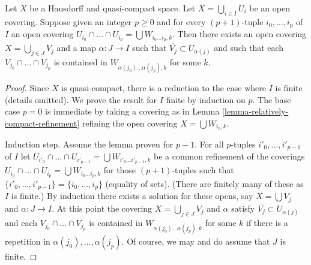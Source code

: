 \begin{lemma}
\label{lemma-refine-covering}
Let $X$ be a Hausdorff and quasi-compact space.
Let $X = \bigcup_{i \in I} U_i$ be an open covering.
Suppose given an integer $p \geq 0$ and for every $(p + 1)$-tuple
$i_0, \ldots, i_p$ of $I$ an open covering
$U_{i_0} \cap \ldots \cap U_{i_p} = \bigcup W_{i_0 \ldots i_p, k}$.
Then there exists an open covering $X = \bigcup_{j \in J} V_j$
and a map $\alpha : J \to I$ such that $\overline{V_j} \subset U_{\alpha(j)}$
and such that each $V_{j_0} \cap \ldots \cap V_{j_p}$
is contained in $W_{\alpha(j_0) \ldots \alpha(j_p), k}$
for some $k$.
\end{lemma}

\begin{proof}
Since $X$ is quasi-compact, there is a reduction to the
case where $I$ is finite (details omitted).
We prove the result for $I$ finite by induction on $p$.
The base case $p = 0$ is immediate by taking a covering as in
Lemma \ref{lemma-relatively-compact-refinement}
refining the open covering $X = \bigcup W_{i_0, k}$.

\medskip\noindent
Induction step. Assume the lemma proven for $p - 1$.
For all $p$-tuples $i'_0, \ldots, i'_{p - 1}$ of $I$ let
$U_{i'_0} \cap \ldots \cap U_{i'_{p - 1}} =
\bigcup W_{i'_0 \ldots i'_{p - 1}, k}$
be a common refinement of the coverings
$U_{i_0} \cap \ldots \cap U_{i_p} = \bigcup W_{i_0 \ldots i_p, k}$
for those $(p + 1)$-tuples such that
$\{i'_0, \ldots, i'_{p - 1}\} = \{i_0, \ldots, i_p\}$ (equality of sets).
(There are finitely many of these as $I$ is finite.)
By induction there exists a solution for these opens, say
$X = \bigcup V_j$ and $\alpha : J \to I$.
At this point the covering $X = \bigcup_{j \in J} V_j$
and $\alpha$ satisfy $\overline{V_j} \subset U_{\alpha(j)}$
and each $V_{j_0} \cap \ldots \cap V_{j_p}$
is contained in $W_{\alpha(j_0) \ldots \alpha(j_p), k}$
for some $k$ if there is a repetition in $\alpha(j_0), \ldots, \alpha(j_p)$.
Of course, we may and do assume that $J$ is finite.


\end{proof}
